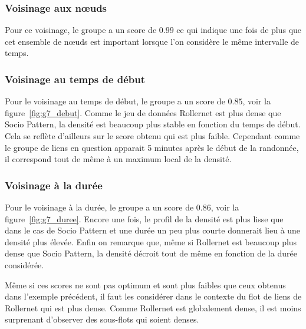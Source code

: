 \subsubsection*{Voisinage aux n\oe uds}
Pour ce voisinage, le groupe a un score de $0.99$ ce qui indique une fois de plus que cet ensemble de n\oe uds est important lorsque l'on considère le même intervalle de temps.

\subsubsection*{Voisinage au temps de début}
Pour le voisinage au temps de début, le groupe a un score de $0.85$, voir la figure~\ref{fig:g7_debut}.
Comme le jeu de données Rollernet est plus dense que Socio Pattern, la densité est beaucoup plus stable en fonction du temps de début.
Cela se reflète d'ailleurs sur le score obtenu qui est plus faible.
Cependant comme le groupe de liens en question apparait 5 minutes après le début de la randonnée, il correspond tout de même à un maximum local de la densité.


\subsubsection*{Voisinage à la durée}
Pour le voisinage à la durée, le groupe a un score de $0.86$, voir la figure~\ref{fig:g7_duree}.
Encore une fois, le profil de la densité est plus lisse que dans le cas de Socio Pattern et une durée un peu plus courte donnerait lieu à une densité plus élevée.
Enfin on remarque que, même si Rollernet est beaucoup plus dense que Socio Pattern, la densité décroit tout de même en fonction de la durée considérée.

\bigskip

Même si ces scores ne sont pas optimum et sont plus faibles que ceux obtenus dans l'exemple précédent, il faut les considérer dans le contexte du flot de liens de Rollernet qui est plus dense.
Comme Rollernet est globalement dense, il est moins surprenant d'observer des sous-flots qui soient denses.
 

